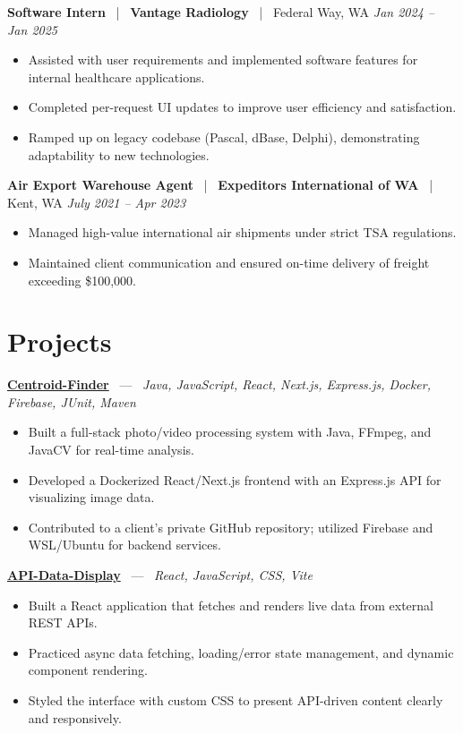 \documentclass[10pt, letterpaper]{article}
\newcommand{\jobhead}[4]{%
  \vspace{5pt}%
  {\bfseries\color{dark}#1}%
  ~{\color{light}|}~%
  {\bfseries\color{navy}#2}%
  ~{\color{light}|}~%
  {\color{light}#3}%
  \hfill{\color{light}\small\textit{#4}}\\[-2pt]%
}
\newcommand{\projhead}[3]{%
  \vspace{5pt}%
  {\bfseries\color{dark}\href{#2}{#1}}%
  ~{\color{light}---}~%
  {\color{light}\small\textit{#3}}\\[-2pt]%
}
\begin{document}
\jobhead{Software Intern}{Vantage Radiology}{Federal Way, WA}{Jan 2024 – Jan 2025}
\begin{itemize}
  \item Assisted with user requirements and implemented software features for internal healthcare applications.
  \item Completed per-request UI updates to improve user efficiency and satisfaction.
  \item Ramped up on legacy codebase (Pascal, dBase, Delphi), demonstrating adaptability to new technologies.
\end{itemize}

\jobhead{Air Export Warehouse Agent}{Expeditors International of WA}{Kent, WA}{July 2021 – Apr 2023}
\begin{itemize}
  \item Managed high-value international air shipments under strict TSA regulations.
  \item Maintained client communication and ensured on-time delivery of freight exceeding \$100,000.
\end{itemize}

\section{Projects}

\projhead{Centroid-Finder}{https://github.com/xavierb117/centroid-finder}{Java, JavaScript, React, Next.js, Express.js, Docker, Firebase, JUnit, Maven}
\begin{itemize}
  \item Built a full-stack photo/video processing system with Java, FFmpeg, and JavaCV for real-time analysis.
  \item Developed a Dockerized React/Next.js frontend with an Express.js API for visualizing image data.
  \item Contributed to a client's private GitHub repository; utilized Firebase and WSL/Ubuntu for backend services.
\end{itemize}

\projhead{API-Data-Display}{https://github.com/timmyd4/API-Data-Display}{React, JavaScript, CSS, Vite}
\begin{itemize}
  \item Built a React application that fetches and renders live data from external REST APIs.
  \item Practiced async data fetching, loading/error state management, and dynamic component rendering.
  \item Styled the interface with custom CSS to present API-driven content clearly and responsively.
\end{itemize}
\end{document}
